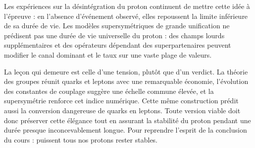 Les expériences sur la désintégration du proton continuent de mettre cette idée à l’épreuve : en l’absence d’événement observé, elles repoussent la limite inférieure de sa durée de vie. Les modèles supersymétriques de grande unification ne prédisent pas une durée de vie universelle du proton : des champs lourds supplémentaires et des opérateurs dépendant des superpartenaires peuvent modifier le canal dominant et le taux sur une vaste plage de valeurs.


La leçon qui demeure est celle d’une tension, plutôt que d’un verdict. La théorie des groupes réunit quarks et leptons avec une remarquable économie, l’évolution des constantes de couplage suggère une échelle commune élevée, et la supersymétrie renforce cet indice numérique. Cette même construction prédit aussi la conversion dangereuse de quarks en leptons. Toute version viable doit donc préserver cette élégance tout en assurant la stabilité du proton pendant une durée presque inconcevablement longue. Pour reprendre l’esprit de la conclusion du cours : puissent tous nos protons rester stables.
